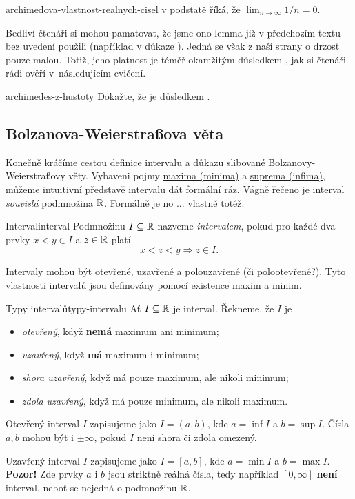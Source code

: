 \begin{remark}{}{archimedova-vlastnost-realnych-cisel}
  v podstatě říká, že
 $\lim_{n \to \infty} 1 / n = 0$.

 Bedliví čtenáři si mohou pamatovat, že jsme ono lemma již v předchozím textu
 bez uvedení použili (například v důkaze ).
 Jedná se však z naší strany o drzost pouze malou. Totiž, jeho platnost je téměř
 okamžitým důsledkem , jak si čtenáři rádi
 ověří v~následujícím cvičení.
\end{remark}
\begin{exercise}{}{archimedes-z-hustoty}
 Dokažte, že  je
 důsledkem .
\end{exercise}

\subsection{Bolzanova-Weierstraßova věta}
\label{ssec:bolzanova-weierstraova-veta}

Konečně kráčíme cestou definice intervalu a důkazu slibované
Bolzanovy-Weierstraßovy věty. Vybaveni pojmy
\hyperref[def:maximum-a-minimum]{maxima (minima)} a
\hyperref[def:supremum-a-infimum]{suprema (infima)}, můžeme intuitivní
představě intervalu dát formální ráz. Vágně řečeno je interval \emph{souvislá}
podmnožina $\mathbb{R}$. Formálně je no ... vlastně totéž.

\begin{definition}{Interval}{interval}
 Podmnožinu $I \subseteq \mathbb{R}$ nazveme \emph{intervalem}, pokud pro každé dva
 prvky $x < y \in I$ a $z \in \mathbb{R}$ platí
 \[
  x < z < y \Rightarrow z \in I.
 \]
\end{definition}

Intervaly mohou být otevřené, uzavřené a polouzavřené (či polootevřené?). Tyto
vlastnosti intervalů jsou definovány pomocí existence maxim a minim.

\begin{definition}{Typy intervalů}{typy-intervalu}
 Ať $I \subseteq \mathbb{R}$ je interval. Řekneme, že $I$ je
 \begin{itemize}
  \item \emph{otevřený}, když \textbf{nemá} maximum ani minimum;
  \item \emph{uzavřený}, když \textbf{má} maximum i minimum;
  \item \emph{shora uzavřený}, když má pouze maximum, ale nikoli minimum;
  \item \emph{zdola uzavřený}, když má pouze minimum, ale nikoli maximum.
 \end{itemize}
 Otevřený interval $I$ zapisujeme jako $I = (a,b)$, kde $a = \inf I$ a $b = \sup
 I$. Čísla $a,b$ mohou být i $ \pm \infty$, pokud $I$ není shora či zdola
 omezený.

 Uzavřený interval $I$ zapisujeme jako $I = [a,b]$, kde $a = \min I$ a $b = \max
 I$. \textbf{Pozor!} Zde prvky $a$ i $b$ jsou striktně reálná čísla, tedy
 například $[0,\infty]$ \textbf{není} interval, neboť se nejedná o podmnožinu
 $\mathbb{R}$.
\end{definition}

